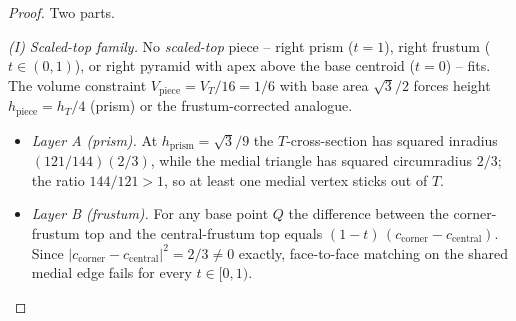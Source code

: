 \documentclass[11pt,a4paper]{article}
\theoremstyle{plain}
\theoremstyle{definition}
\theoremstyle{remark}
\begin{document}
\begin{proof}
Two parts.

\emph{(I) Scaled-top family.}
No \emph{scaled-top} piece -- right prism ($t = 1$), right frustum
($t \in (0,1)$), or right pyramid with apex above the base centroid ($t = 0$)
-- fits.  The volume constraint $V_{\mathrm{piece}} = V_{T}/16 = 1/6$ with base
area $\sqrt 3/2$ forces height $h_{\mathrm{piece}} = h_{T}/4$ (prism) or the
frustum-corrected analogue.
\begin{itemize}
  \item \emph{Layer A (prism).}  At $h_{\mathrm{prism}} = \sqrt 3/9$ the
        $T$-cross-section has squared inradius $(121/144)(2/3)$, while the
        medial triangle has squared circumradius $2/3$; the ratio
        $144/121 > 1$, so at least one medial vertex sticks out of $T$.
  \item \emph{Layer B (frustum).}  For any base point $Q$ the difference
        between the corner-frustum top and the central-frustum top equals
        $(1 - t)\,(c_{\mathrm{corner}} - c_{\mathrm{central}})$.  Since
        $|c_{\mathrm{corner}} - c_{\mathrm{central}}|^{2} = 2/3 \neq 0$
        exactly, face-to-face matching on the shared medial edge fails for
        every $t \in [0, 1)$.
\end{itemize}


\end{proof}
\end{document}
